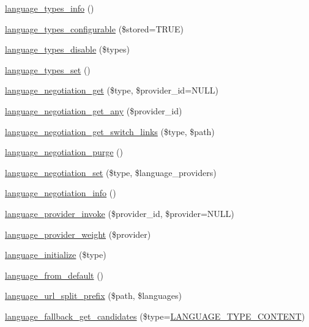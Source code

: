 \begin{DoxyCompactItemize}
\item 
\hyperlink{group__language__negotiation_gadf6422ee7cb14204e01311f85a8c8b18}{language\_\-types\_\-info} ()
\item 
\hyperlink{group__language__negotiation_gaa05284e85de23a8a8ab54adbd8548cb4}{language\_\-types\_\-configurable} (\$stored=TRUE)
\item 
\hyperlink{group__language__negotiation_ga04fd94cbb41f6b24ef9d3b4c37df86c1}{language\_\-types\_\-disable} (\$types)
\item 
\hyperlink{group__language__negotiation_ga6f6a0814332d6232293b84b38de5d4d0}{language\_\-types\_\-set} ()
\item 
\hyperlink{group__language__negotiation_ga041066fd7d9ca70def383225d104c431}{language\_\-negotiation\_\-get} (\$type, \$provider\_\-id=NULL)
\item 
\hyperlink{group__language__negotiation_gadee487a44c0202fa55b74ea1541055d0}{language\_\-negotiation\_\-get\_\-any} (\$provider\_\-id)
\item 
\hyperlink{group__language__negotiation_gab97e8b88791a7487449a1a1e4eec871c}{language\_\-negotiation\_\-get\_\-switch\_\-links} (\$type, \$path)
\item 
\hyperlink{group__language__negotiation_ga3a0f894378f49038dbbaf35909a8e215}{language\_\-negotiation\_\-purge} ()
\item 
\hyperlink{group__language__negotiation_ga3a4f8df0ad1b5fef7399929111bab35a}{language\_\-negotiation\_\-set} (\$type, \$language\_\-providers)
\item 
\hyperlink{group__language__negotiation_ga5e41e506c539a01a4ee945857c526e78}{language\_\-negotiation\_\-info} ()
\item 
\hyperlink{group__language__negotiation_ga031f4e0102fa2365a45709ff6935fee2}{language\_\-provider\_\-invoke} (\$provider\_\-id, \$provider=NULL)
\item 
\hyperlink{group__language__negotiation_ga6ab68f6fac82e1ae755c06787b042a39}{language\_\-provider\_\-weight} (\$provider)
\item 
\hyperlink{group__language__negotiation_ga483a318f6485628cbe7bdbf53bf80c5e}{language\_\-initialize} (\$type)
\item 
\hyperlink{group__language__negotiation_ga643666b0e37987d93ab75235bb7729b5}{language\_\-from\_\-default} ()
\item 
\hyperlink{group__language__negotiation_gab8ad64d53e83cae459c25341e564968d}{language\_\-url\_\-split\_\-prefix} (\$path, \$languages)
\item 
\hyperlink{group__language__negotiation_gaaea53d7377445168a1e71bf982d59f11}{language\_\-fallback\_\-get\_\-candidates} (\$type=\hyperlink{bootstrap_8inc_a40466aefcfc6ea9766f1fedf53cb3a6d}{LANGUAGE\_\-TYPE\_\-CONTENT})
\end{DoxyCompactItemize}


